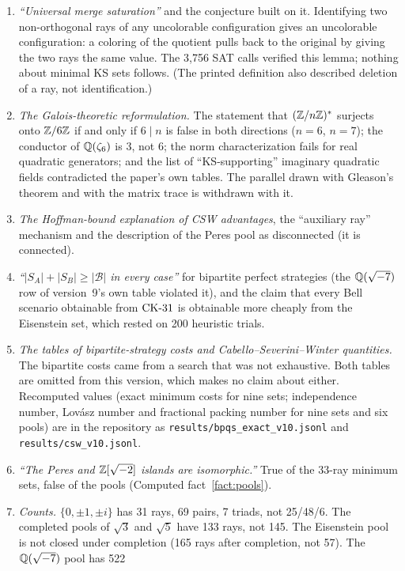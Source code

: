\begin{enumerate}[label=C\arabic*.,leftmargin=2.6em]
overstated what was run.
\item \emph{``Universal merge saturation''} and the conjecture built on it.  Identifying two
non-orthogonal rays of any uncolorable configuration gives an uncolorable configuration: a
coloring of the quotient pulls back to the original by giving the two rays the same value.  The
3{,}756 SAT calls verified this lemma; nothing about minimal KS sets follows.  (The printed
definition also described deletion of a ray, not identification.)
\item \emph{The Galois-theoretic reformulation.}  The statement that $(\mathbb{Z}/n\mathbb{Z})^{*}$ surjects onto
$\mathbb{Z}/6\mathbb{Z}$ if and only if $6\mid n$ is false in both directions ($n=6$, $n=7$); the conductor of
$\mathbb{Q}(\zeta_6)$ is 3, not 6; the norm characterization fails for real quadratic generators; and the
list of ``KS-supporting'' imaginary quadratic fields contradicted the paper's own tables.  The
parallel drawn with Gleason's theorem and with the matrix trace is withdrawn with it.
\item \emph{The Hoffman-bound explanation of CSW advantages}, the ``auxiliary ray'' mechanism and
the description of the Peres pool as disconnected (it is connected).
\item \emph{``$|S_A|+|S_B|\ge|\mathcal B|$ in every case''} for bipartite perfect strategies
(the $\mathbb{Q}(\sqrt{-7})$ row of version~9's own table violated it), and the
claim that every Bell scenario obtainable from $\mathrm{CK}\text{-}31$ is obtainable more cheaply from the
Eisenstein set, which rested on 200 heuristic trials.
\item \emph{The tables of bipartite-strategy costs and Cabello--Severini--Winter quantities.}
The bipartite costs came from a search that was not exhaustive.  Both tables are omitted from
this version, which makes no claim about either.  Recomputed values (exact minimum costs for
nine sets; independence number, Lov\'asz number and fractional packing number for nine sets and
six pools) are in the repository as \texttt{results/bpqs\_exact\_v10.jsonl} and
\texttt{results/csw\_v10.jsonl}.
\item \emph{``The Peres and $\mathbb{Z}[\sqrt{-2}]$ islands are isomorphic.''}  True of the 33-ray minimum
sets, false of the pools (Computed fact~\ref{fact:pools}).
\item \emph{Counts.}  $\{0,\pm1,\pm i\}$ has 31 rays, 69 pairs, 7 triads, not 25/48/6.  The
completed pools of $\sqrt3$ and $\sqrt5$ have 133 rays, not 145.  The Eisenstein pool is not
closed under completion (165 rays after completion, not 57).  The $\mathbb{Q}(\sqrt{-7})$ pool has 522

\end{enumerate}
